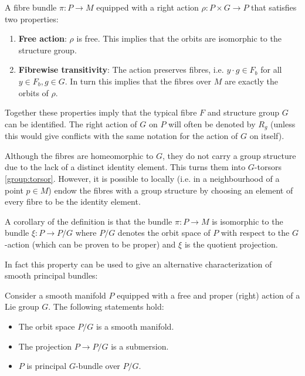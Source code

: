     \begin{definition}
        A fibre bundle $\pi:P\rightarrow M$ equipped with a right action $\rho:P\times G\rightarrow P$ that satisfies two properties:
        \begin{enumerate}
            \item\textbf{Free action}: $\rho$ is free. This implies that the orbits are isomorphic to the structure group.
            \item\textbf{Fibrewise transitivity}: The action preserves fibres, i.e. $y\cdot g\in F_b$ for all $y\in F_b, g\in G$. In turn this implies that the fibres over $M$ are exactly the orbits of $\rho$.
        \end{enumerate}
        Together these properties imply that the typical fibre $F$ and structure group $G$ can be identified. The right action of $G$ on $P$ will often be denoted by $R_g$ (unless this would give conflicts with the same notation for the action of $G$ on itself).
    \end{definition}
    \begin{remark}[$G$-torsor]\label{bundle:fibre_torsor}
        Although the fibres are homeomorphic to $G$, they do not carry a group structure due to the lack of a distinct identity element. This turns them into $G$-torsors \ref{group:torsor}. However, it is possible to locally (i.e. in a neighbourhood of a point $p\in M$) endow the fibres with a group structure by choosing an element of every fibre to be the identity element.
    \end{remark}
    \begin{property}
        A corollary of the definition is that the bundle $\pi:P\rightarrow M$ is isomorphic to the bundle $\xi:P\rightarrow P/G$ where $P/G$ denotes the orbit space of $P$ with respect to the $G$-action (which can be proven to be proper) and $\xi$ is the quotient projection.
    \end{property}
    In fact this property can be used to give an alternative characterization of smooth principal bundles:
    \begin{property}\label{bundle:quotient_manifold_theorem}
        Consider a smooth manifold $P$ equipped with a free and proper (right) action of a Lie group $G$. The following statements hold:
        \begin{itemize}
            \item The orbit space $P/G$ is a smooth manifold.
            \item The projection $P\rightarrow P/G$ is a submersion.
            \item $P$ is principal $G$-bundle over $P/G$.
        \end{itemize}
    \end{property}

